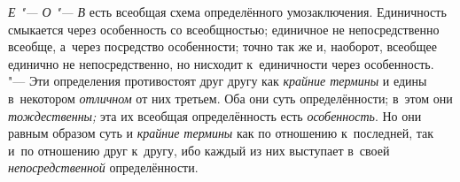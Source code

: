 
{\em Е "--- О "--- В}
есть всеобщая схема определённого умозаключения. Единичность
смыкается через особенность со всеобщностью; единичное не непосредственно
всеобще, а~через посредство особенности; точно так же и, наоборот, всеобщее
единично не непосредственно, но нисходит к~единичности через особенность.
"--- Эти определения противостоят друг другу как
{\em крайние термины} и
едины в~некотором {\em отличном}
от них третьем. Оба они суть определённости; в~этом они
{\em тождественны;} эта
их всеобщая определённость есть
{\em особенность}. Но они
равным образом суть и {\em крайние
термины} как по отношению к~последней, так и~по отношению
друг к~другу, ибо каждый из них выступает в~своей
{\em непосредственной}
определённости.

